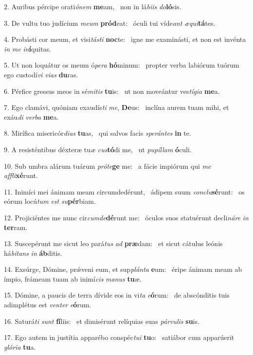 2. Auribus pércipe orati\textit{ó}\textit{nem} \textbf{me}am, \ast\  non in lá\textit{bi}\textit{is} \textit{do}\textbf{ló}sis.\

3. De vultu tuo judícium \textit{me}\textit{um} \textbf{pród}eat: \ast\  óculi tui víde\textit{ant} \textit{æ}\textit{qui}\textbf{tá}tes.\

4. Probásti cor meum, et visi\textit{tás}\textit{ti} \textbf{noc}te: \ast\  igne me examinásti, et non est invénta \textit{in} \textit{me} \textit{in}\textbf{í}quitas.\

5. Ut non loquátur os meum ó\textit{pe}\textit{ra} \textbf{hó}minum: \ast\  propter verba labiórum tuórum ego custodí\textit{vi} \textit{vi}\textit{as} \textbf{du}ras.\

6. Pérfice gressus meos in sé\textit{mi}\textit{tis} \textbf{tu}is: \ast\  ut non moveántur ves\textit{tí}\textit{gi}\textit{a} \textbf{me}a.\

7. Ego clamávi, quóniam exaudís\textit{ti} \textit{me}, \textbf{De}us: \ast\  inclína aurem tuam mihi, et exáu\textit{di} \textit{ver}\textit{ba} \textbf{me}a.\

8. Mirífica misericór\textit{di}\textit{as} \textbf{tu}as, \ast\  qui salvos facis \textit{spe}\textit{rán}\textit{tes} \textbf{in} te.\

9. A resisténtibus déxteræ tu\textit{æ} \textit{cus}\textbf{tó}di me, \ast\  ut \textit{pu}\textit{píl}\textit{lam} \textbf{ó}culi.\

10. Sub umbra alárum tuárum \textit{pró}\textit{te}\textbf{ge} me: \ast\  a fácie impiórum qui \textit{me} \textit{af}\textit{fli}\textbf{xé}runt.\

11. Inimíci mei ánimam meam circumdedérunt, \dag\  ádipem suum \textit{con}\textit{clu}\textbf{sé}runt: \ast\  os eórum locú\textit{tum} \textit{est} \textit{su}\textbf{pér}biam.\

12. Projiciéntes me nunc cir\textit{cum}\textit{de}\textbf{dé}runt me: \ast\  óculos suos statuérunt decli\textit{ná}\textit{re} \textit{in} \textbf{ter}ram.\

13. Suscepérunt me sicut leo pará\textit{tus} \textit{ad} \textbf{præ}dam: \ast\  et sicut cátulus leónis há\textit{bi}\textit{tans} \textit{in} \textbf{áb}ditis.\

14. Exsúrge, Dómine, prǽveni eum, et sup\textit{plán}\textit{ta} \textbf{e}um: \ast\  éripe ánimam meam ab ímpio, frámeam tuam ab inimí\textit{cis} \textit{ma}\textit{nus} \textbf{tu}æ.\

15. Dómine, a paucis de terra dívide eos in vi\textit{ta} \textit{e}\textbf{ó}rum: \ast\  de abscónditis tuis adimplétus est \textit{ven}\textit{ter} \textit{e}\textbf{ó}rum.\

16. Saturá\textit{ti} \textit{sunt} \textbf{fí}liis: \ast\  et dimisérunt relíquias suas \textit{pár}\textit{vu}\textit{lis} \textbf{su}is.\

17. Ego autem in justítia apparébo conspéc\textit{tu}\textit{i} \textbf{tu}o: \ast\  satiábor cum apparúerit \textit{gló}\textit{ri}\textit{a} \textbf{tu}a.\

